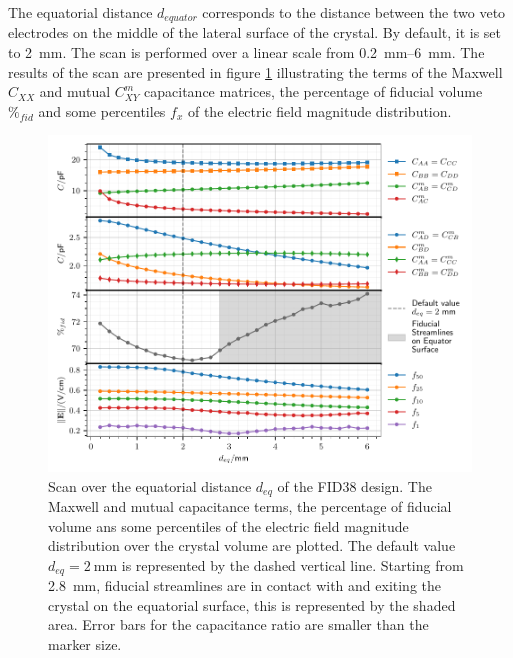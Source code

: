 The equatorial distance $d_{equator}$ corresponds to the distance between the two veto electrodes on the middle of the lateral surface of the crystal. By default, it is set to \SI{2}{\mm}. The scan is performed over a linear scale from \SIrange{0.2}{6}{\mm}. The results of the scan are presented in figure \ref{fig:capacitance-fiducial-equatorial-distance} illustrating the terms of the Maxwell $C_{XX}$ and mutual $C_{XY}^m$ capacitance matrices, the percentage of fiducial volume $\%_{fid}$ and some percentiles $f_x$ of the electric field magnitude distribution. 

\begin{figure}
\centering
\includegraphics[scale=1]{Figures/ElectrodesScan/capacitance_fiducial_equatorial_distance.pdf}
\caption{Scan over the equatorial distance $d_{eq}$ of the FID38 design. The Maxwell and mutual capacitance terms, the percentage of fiducial volume ans some percentiles of the electric field magnitude distribution over the crystal volume are plotted. The default value $d_{eq}=\SI{2}{\mm}$ is represented by the dashed vertical line. Starting from \SI{2.8}{\mm}, fiducial streamlines are in contact with and exiting the crystal on the equatorial surface, this is represented by the shaded area. Error bars for the capacitance ratio are smaller than the marker size.}
\label{fig:capacitance-fiducial-equatorial-distance}
\end{figure}


